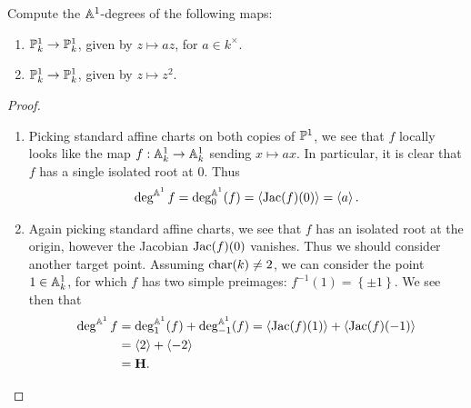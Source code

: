 \documentclass[english]{article}
\begin{document}
\setcounter{subsection}{3}
\setcounter{theorem}{0}
\begin{exercise}\label{exerc:degree} Compute the $\A^1$-degrees of the following maps:
\begin{enumerate}
\item $\P_k^1 \to \P_k^1$, given by $z \mapsto az$, for $a\in k^\times$.
\item $\P_k^1 \to \P_k^1$, given by $z \mapsto z^2$.
\end{enumerate}
\end{exercise}
\begin{proof} $\ $
\begin{enumerate}
    \item Picking standard affine charts on both copies of $\P^1$, we see that $f$ locally looks like the map $f: \A^1_k \to \A^1_k$ sending $x \mapsto ax$. In particular, it is clear that $f$ has a single isolated root at $0$. Thus
    \begin{align*}
        \deg^{\A^1} f = \deg^{\A^1}_0(f) = \left\langle \Jac(f)(0) \right\rangle = \left\langle a \right\rangle.
    \end{align*}
    
    \item Again picking standard affine charts, we see that $f$ has an isolated root at the origin, however the Jacobian $\Jac(f)(0)$ vanishes. Thus we should consider another target point. Assuming $\char(k) \ne 2$, we can consider the point $1 \in \A^1_k$, for which $f$ has two simple preimages: $f^{-1}(1) = \left\{ \pm 1 \right\}$. We see then that
    \begin{align*}
        \deg^{\A^1} f &= \deg^{\A^1}_1 (f) + \deg^{\A^1}_{-1}(f) = \left\langle \Jac(f)(1) \right\rangle + \left\langle \Jac(f)(-1) \right\rangle \\
        &= \left\langle 2 \right\rangle + \left\langle -2 \right\rangle \\
        &= \H.
    \end{align*}
\end{enumerate}
\end{proof}
\end{document}
